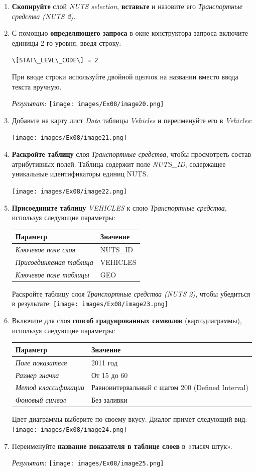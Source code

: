 \documentclass[12pt,]{book}
\begin{document}
\begin{enumerate}
\def\labelenumi{\arabic{enumi}.}
\item
  \textbf{Скопируйте} слой \emph{NUTS selection}, \textbf{вставьте} и назовите его \emph{Транспортные средства (NUTS 2)}.
\item
  С помощью \textbf{определяющего запроса} в окне конструктора запроса включите единицы 2-го уровня, введя строку:

  \texttt{\textbackslash{}{[}STAT\textbackslash{}\_LEVL\textbackslash{}\_CODE\textbackslash{}{]}\ =\ 2}

  При вводе строки используйте двойной щелчок на названии вместо ввода текста вручную.

  \emph{Результат}:
  \texttt{[image: images/Ex08/image20.png]}
\item
  Добавьте на карту лист \emph{Data} таблицы \emph{Vehicles} и переименуйте его в \emph{Vehicles}:

  \texttt{[image: images/Ex08/image21.png]}
\item
  \textbf{Раскройте таблицу} слоя \emph{Транспортные средства}, чтобы просмотреть состав атрибутивных полей. Таблица содержит поле \emph{NUTS\_ID}, содержащее уникальные идентификаторы единиц NUTS.

  \texttt{[image: images/Ex08/image22.png]}
\item
  \textbf{Присоедините таблицу} \emph{VEHICLES} к слою \emph{Транспортные средства}, используя следующие параметры:

  \begin{longtable}[]{@{}ll@{}}
  \toprule
  Параметр & Значение\tabularnewline
  \midrule
  \endhead
  \emph{Ключевое поле слоя} & NUTS\_ID\tabularnewline
  \emph{Присоединяемая таблица} & VEHICLES\tabularnewline
  \emph{Ключевое поле таблицы} & GEO\tabularnewline
  \bottomrule
  \end{longtable}

  Раскройте таблицу слоя \emph{Транспортные средства (NUTS 2)}, чтобы убедиться в результате:
  \texttt{[image: images/Ex08/image23.png]}
\item
  Включите для слоя \textbf{способ градуированных символов} (картодиаграммы), используя следующие параметры:

  \begin{longtable}[]{@{}ll@{}}
  \toprule
  Параметр & Значение\tabularnewline
  \midrule
  \endhead
  \emph{Поле показателя} & 2011 год\tabularnewline
  \emph{Размер значка} & От 15 до 60\tabularnewline
  \emph{Метод классификации} & Равноинтервальный с шагом 200 (Defined Interval)\tabularnewline
  \emph{Фоновый символ} & Без заливки\tabularnewline
  \bottomrule
  \end{longtable}

  Цвет диаграммы выберите по своему вкусу. Диалог примет следующий вид:
  \texttt{[image: images/Ex08/image24.png]}
\item
  Переименуйте \textbf{название показателя в таблице слоев} в «тысяч штук».

  \emph{Результат}:
  \texttt{[image: images/Ex08/image25.png]}
\end{enumerate}
\end{document}

